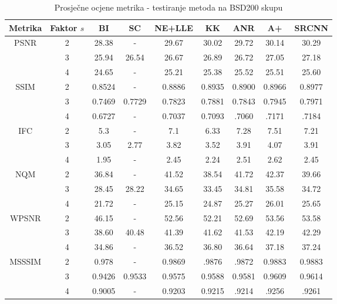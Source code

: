 \documentclass[12pt]{report}
\numberwithin{equation}{section}
\begin{document}
\begin{table}[h!]
\centering
\begin{tabular}{ |c|c|c|c|c|c|c|c|c| } 
\hline
Metrika & Faktor $s$ & BI & SC & NE+LLE & KK & ANR & A+ & SRCNN \\
\hline
\multirow{3}{*}{PSNR}& 2 & 28.38 & - & 29.67 & 30.02 & 29.72 & 30.14 & 30.29\\
            & 3 & 25.94 & 26.54 & 26.67 & 26.89 & 26.72 &27.05 & 27.18 \\
& 4 & 24.65 & - & 25.21 & 25.38 & 25.52 & 25.51 & 25.60 \\ 
\hline
\multirow{3}{*}{SSIM}& 2 & 0.8524 & - & 0.8886 & 0.8935 & 0.8900 & 0.8966 & 0.8977\\
  &           3 & 0.7469 & 0.7729 & 0.7823 & 0.7881 & 0.7843 & 0.7945 & 0.7971 \\
& 4 & 0.6727 & - & 0.7037 & 0.7093 & .7060 & .7171 & .7184 \\ 
\hline
\multirow{3}{*}{IFC}& 2 & 5.3 & - & 7.1 & 6.33 & 7.28 & 7.51 & 7.21\\
  &           3 & 3.05 & 2.77 & 3.82 & 3.52 & 3.91 & 4.07 & 3.91 \\
& 4 & 1.95 & - & 2.45 & 2.24 & 2.51 & 2.62 & 2.45 \\ 
\hline
\multirow{3}{*}{NQM}& 2 & 36.84 & - & 41.52 & 38.54 & 41.72 & 42.37 & 39.66\\
  &           3 & 28.45 & 28.22 & 34.65 & 33.45 & 34.81 & 35.58 & 34.72 \\
& 4 & 21.72 & - & 25.15 & 24.87 & 25.27 & 26.01 & 25.65 \\ 
\hline
\multirow{3}{*}{WPSNR}& 2 & 46.15 & - & 52.56 & 52.21 & 52.69 & 53.56 & 53.58\\
  &           3 & 38.60 & 40.48 & 41.39 & 41.62 & 41.53 & 42.19 & 42.29 \\
& 4 & 34.86 & - & 36.52 & 36.80 & 36.64 & 37.18 & 37.24 \\ 
\hline
\multirow{3}{*}{MSSSIM}& 2 & 0.978 & - & 0.9869 & .9876 & .9872 & 0.9883 & 0.9883\\
  &           3 & 0.9426 & 0.9533 & 0.9575 & 0.9588 & 0.9581 & 0.9609 & 0.9614 \\
& 4 & 0.9005 & - & 0.9203 & 0.9215 & .9214 & .9256 & .9261 \\ 
\hline
\end{tabular}
\caption{Prosječne ocjene metrika - testiranje metoda na BSD200 skupu}
\label{table:3}
\end{table}

\newpage
\end{document}

